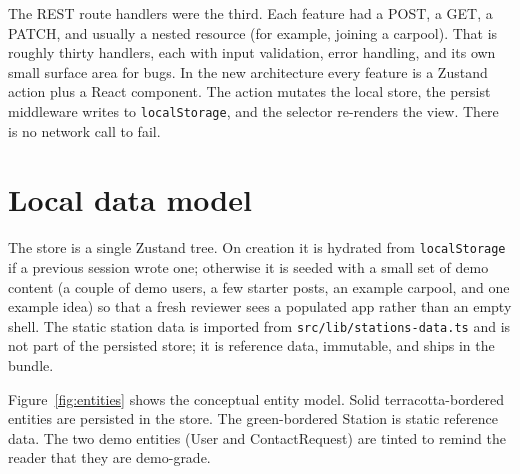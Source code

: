 \documentclass[a4paper,11pt]{article}
\begin{document}
The REST route handlers were the third. Each feature had a POST, a GET, a
PATCH, and usually a nested resource (for example, joining a carpool). That
is roughly thirty handlers, each with input validation, error handling, and
its own small surface area for bugs. In the new architecture every feature is
a Zustand action plus a React component. The action mutates the local store,
the persist middleware writes to \texttt{localStorage}, and the selector
re-renders the view. There is no network call to fail.


\section{Local data model}

The store is a single Zustand tree. On creation it is hydrated from
\texttt{localStorage} if a previous session wrote one; otherwise it is seeded
with a small set of demo content (a couple of demo users, a few starter
posts, an example carpool, and one example idea) so that a fresh reviewer sees
a populated app rather than an empty shell. The static station data is
imported from \texttt{src/lib/stations-data.ts} and is not part of the
persisted store; it is reference data, immutable, and ships in the bundle.

Figure~\ref{fig:entities} shows the conceptual entity model. Solid
terracotta-bordered entities are persisted in the store. The green-bordered
Station is static reference data. The two demo entities (User and
ContactRequest) are tinted to remind the reader that they are demo-grade.
\end{document}
